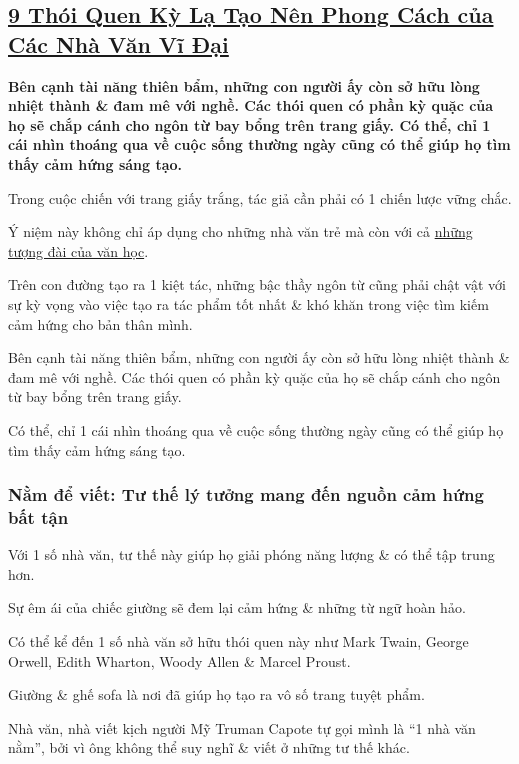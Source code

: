 \documentclass{article}
\begin{document}
\subsection{\href{http://tramdoc.vn/tin-tuc/9-thoi-quen-ky-la-tao-nen-phong-cach-cua-cac-nha-van-vi-dai-nmwejW.html}{9 Thói Quen Kỳ Lạ Tạo Nên Phong Cách của Các Nhà Văn Vĩ Đại}}

\textbf{Bên cạnh tài năng thiên bẩm, những con người ấy còn sở hữu lòng nhiệt thành \& đam mê với nghề. Các thói quen có phần kỳ quặc của họ sẽ chắp cánh cho ngôn từ bay bổng trên trang giấy. Có thể, chỉ 1 cái nhìn thoáng qua về cuộc sống thường ngày cũng có thể giúp họ tìm thấy cảm hứng sáng tạo.}

%
Trong cuộc chiến với trang giấy trắng, tác giả cần phải có 1 chiến lược vững chắc.

Ý niệm này không chỉ áp dụng cho những nhà văn trẻ mà còn với cả \href{http://tramdoc.vn/tin-tuc/10-tac-pham-kinh-dien-tu-giai-nobel-van-hoc-da-duoc-dich-sang-tieng-viet-nyalW.html}{những tượng đài của văn học}.

Trên con đường tạo ra 1 kiệt tác, những bậc thầy ngôn từ cũng phải chật vật với sự kỳ vọng vào việc tạo ra tác phẩm tốt nhất \& khó khăn trong việc tìm kiếm cảm hứng cho bản thân mình.

%
Bên cạnh tài năng thiên bẩm, những con người ấy còn sở hữu lòng nhiệt thành \& đam mê với nghề. Các thói quen có phần kỳ quặc của họ sẽ chắp cánh cho ngôn từ bay bổng trên trang giấy.

Có thể, chỉ 1 cái nhìn thoáng qua về cuộc sống thường ngày cũng có thể giúp họ tìm thấy cảm hứng sáng tạo.

\subsubsection{Nằm để viết: Tư thế lý tưởng mang đến nguồn cảm hứng bất tận}
Với 1 số nhà văn, tư thế này giúp họ giải phóng năng lượng \& có thể tập trung hơn.

Sự êm ái của chiếc giường sẽ đem lại cảm hứng \& những từ ngữ hoàn hảo.

Có thể kể đến 1 số nhà văn sở hữu thói quen này như Mark Twain, George Orwell, Edith Wharton, Woody Allen \& Marcel Proust.

Giường \& ghế sofa là nơi đã giúp họ tạo ra vô số trang tuyệt phẩm.

Nhà văn, nhà viết kịch người Mỹ Truman Capote tự gọi mình là ``1 nhà văn nằm'', bởi vì ông không thể suy nghĩ \& viết ở những tư thế khác.
\end{document}
